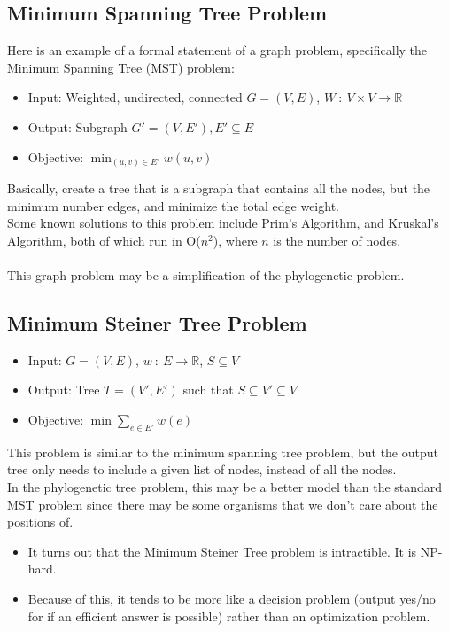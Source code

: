 \documentclass[10pt]{article}
\begin{document}
\subsection*{Minimum Spanning Tree Problem}
Here is an example of a formal statement of a graph problem, specifically the Minimum Spanning Tree (MST) problem:
\begin{itemize}
    \item Input: Weighted, undirected, connected $G = (V, E)$, $W \::\: V \times V \rightarrow \mathbb{R}$
    \item Output: Subgraph $G' = (V, E'), E' \subseteq E$
    \item Objective: $\min_{(u, v) \in E'} w(u, v)$
\end{itemize}
Basically, create a tree that is a subgraph that contains all the nodes, but the minimum number edges, and minimize the total edge weight.\\
Some known solutions to this problem include Prim's Algorithm, and Kruskal's Algorithm, both of which run in O($n^2$), where $n$ is the number of nodes.\\\\
This graph problem may be a simplification of the phylogenetic problem.

\subsection*{Minimum Steiner Tree Problem}
\begin{itemize}
    \item Input: $G = (V, E)$, $w \::\: E \rightarrow \mathbb{R}$, $S \subseteq V$
    \item Output: Tree $T = (V', E')$ such that $S \subseteq V' \subseteq V$
    \item Objective: $\min \sum_{e \in E'} w(e)$
\end{itemize}
This problem is similar to the minimum spanning tree problem, but the output tree only needs to include a given list of nodes, instead of all the nodes.\\
In the phylogenetic tree problem, this may be a better model than the standard MST problem since there may be some organisms that we don't care about the positions of.
\begin{itemize}
    \item It turns out that the Minimum Steiner Tree problem is intractible.  It is NP-hard.
    \item Because of this, it tends to be more like a decision problem (output yes/no for if an efficient answer is possible) rather than an optimization problem.
\end{itemize}
\end{document}
